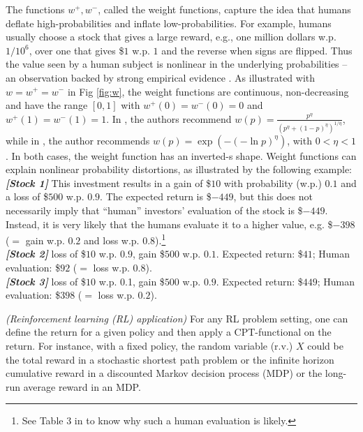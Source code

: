 The functions $w^+, w^-$, called the weight functions, capture the idea that humans deflate high-probabilities and inflate low-probabilities.
For example, humans usually choose a stock that gives a large reward, e.g., 
one million dollars w.p. $1/10^6$, over one that gives \$$1$ w.p. $1$ and the reverse when signs are flipped. 
Thus the value seen by a human subject is nonlinear in the underlying probabilities -- an observation backed by strong empirical evidence \cite{tversky1992advances,Barberis:2012vs}.  
As illustrated with $w=w^+=w^-$ in Fig \ref{fig:w}, the weight functions are continuous, non-decreasing and  have the range $[0,1]$ with $w^+(0)=w^-(0)=0$ and $w^+(1)=w^-(1)=1$. 
In \cite{tversky1992advances}, the authors recommend $w(p) = \frac{p^{\eta}}{{(p^{\eta}+ (1-p)^{\eta})}^{1/\eta}}$, while in \cite{prelec1998probability}, the author recommends $w(p) = \exp(-(-\ln p)^\eta)$, with $0 < \eta <1$. In both cases, the weight function has an inverted-s shape.
Weight functions can explain nonlinear probability distortions, as illustrated by the following example: \\
\textit{\textbf{[Stock 1]}} This investment results in a gain of \$$10$ with probability (w.p.) $0.1$ and a loss of \$$500$ w.p. $0.9$. The expected return is \$$-449$, but this does not necessarily imply that ``human'' investors' evaluation of the stock is \$$-449$. Instead, it is very likely that the humans evaluate it to a higher value, e.g. \$$-398$ ($=$ gain w.p. $0.2$ and loss w.p. $0.8$).\footnote{See Table 3 in \cite{tversky1992advances} to know why such a human evaluation is likely.}\\
\textit{\textbf{[Stock 2]}} loss of \$$10$ w.p. $0.9$, gain \$$500$ w.p. $0.1$. Expected return: \$$41$; Human evaluation: \$$92$ ($=$ loss w.p. $0.8$).\\
\textit{\textbf{[Stock 3]}} loss of \$$10$ w.p. 0.1, gain \$$500$ w.p. $0.9$. Expected return: \$$449$; Human evaluation: \$$398$ ($=$ loss w.p. $0.2$). 
\fi



\begin{remark}\textit{(Reinforcement learning (RL) application)}
For any RL problem setting, one can define the return for a given policy and then apply a CPT-functional on the return. For instance, with a fixed policy, the random variable (r.v.) $X$ could be the total reward in a stochastic shortest path problem or the infinite horizon cumulative reward in a discounted Markov decision process (MDP) or the long-run average reward in an MDP.
\end{remark}


